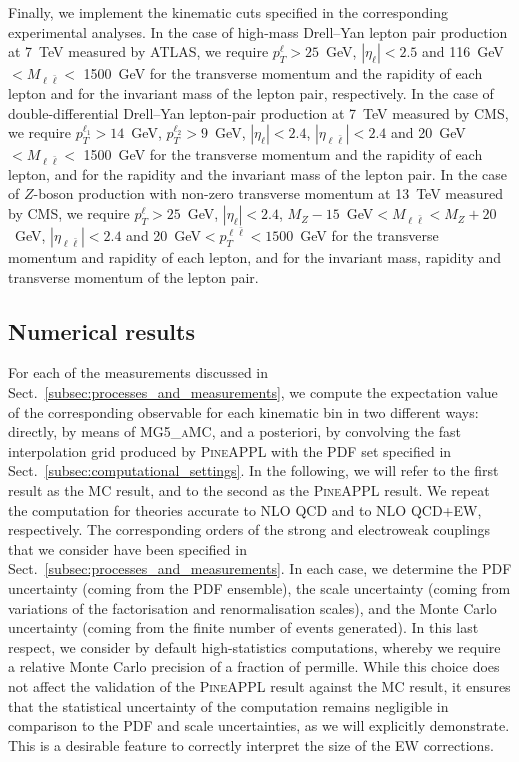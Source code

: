 Finally, we implement the kinematic cuts specified in the corresponding
experimental analyses. In the case of high-mass Drell--Yan lepton pair
production at 7~TeV measured by ATLAS, we require $p_T^\ell>25$~GeV,
$|\eta_\ell|<2.5$ and 116~GeV$<M_{\ell\bar\ell}<$ 1500~GeV for the transverse
momentum and the rapidity of each lepton and for the invariant mass of the
lepton pair, respectively. In the case of double-differential Drell--Yan
lepton-pair production
at 7~TeV measured by CMS, we require $p_T^{\ell_1}>14$~GeV, $p_T^{\ell_2}>9$~GeV,
$|\eta_\ell|<2.4$, $|\eta_{\ell\bar\ell}|<2.4$ and 20~GeV$<M_{\ell\bar\ell}<$ 1500~GeV
for the transverse momentum and the rapidity of each lepton, and for the
rapidity and the invariant mass of the lepton pair. In the case of $Z$-boson
production with non-zero transverse momentum at 13~TeV measured by CMS, we
require $p_T^\ell>25$~GeV, $|\eta_\ell|<2.4$,
$M_Z-15$~GeV$<M_{\ell\bar\ell}<M_Z+20$~GeV,
$|\eta_{\ell\bar\ell}|<2.4$ and 20~GeV$<p_T^{\ell\bar\ell}<1500$~GeV for the
transverse momentum and rapidity of each lepton, and for the invariant mass,
rapidity and transverse momentum of the lepton pair.

\subsection{Numerical results}
\label{subsec:numerical_results}

For each of the measurements discussed in
Sect.~\ref{subsec:processes_and_measurements}, we compute the expectation
value of the corresponding observable for each kinematic bin in two different
ways: directly, by means of \textsc{MG5\_aMC}, and a posteriori, by convolving
the fast interpolation grid produced by \textsc{PineAPPL} with the PDF set
specified in Sect.~\ref{subsec:computational_settings}. In the following, we
will refer to the first result as the \textsc{MC} result, and to the second as
the \textsc{PineAPPL} result. We repeat the computation for theories accurate
to NLO QCD and to NLO QCD+EW, respectively. The corresponding orders of the
strong and electroweak couplings that we consider have been specified in
Sect.~\ref{subsec:processes_and_measurements}. In each case, we determine the
PDF uncertainty (coming from the PDF ensemble), the scale uncertainty (coming
from variations of the factorisation and renormalisation scales), and the Monte
Carlo uncertainty (coming from the finite number of events generated). In this
last respect, we consider by default high-statistics computations, whereby we
require a relative Monte Carlo precision of a fraction of permille. While
this choice does not affect the validation of the \textsc{PineAPPL} result
against the \textsc{MC} result, it ensures that the statistical uncertainty of
the computation remains negligible in comparison to the PDF and scale
uncertainties, as we will explicitly demonstrate. This is a desirable feature
to correctly interpret the size of the EW corrections.

